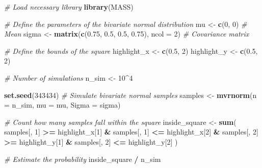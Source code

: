\documentclass[
]{book}
\newenvironment{Shaded}{\begin{snugshade}}{\end{snugshade}}
\newcommand{\AttributeTok}[1]{\textcolor[rgb]{0.13,0.29,0.53}{#1}}
\newcommand{\CommentTok}[1]{\textcolor[rgb]{0.56,0.35,0.01}{\textit{#1}}}
\newcommand{\DecValTok}[1]{\textcolor[rgb]{0.00,0.00,0.81}{#1}}
\newcommand{\FloatTok}[1]{\textcolor[rgb]{0.00,0.00,0.81}{#1}}
\newcommand{\FunctionTok}[1]{\textcolor[rgb]{0.13,0.29,0.53}{\textbf{#1}}}
\newcommand{\NormalTok}[1]{#1}
\newcommand{\OtherTok}[1]{\textcolor[rgb]{0.56,0.35,0.01}{#1}}
\newcommand{\SpecialCharTok}[1]{\textcolor[rgb]{0.81,0.36,0.00}{\textbf{#1}}}
\begin{document}
\begin{Shaded}
\begin{Highlighting}[]
\CommentTok{\# Load necessary library}
\FunctionTok{library}\NormalTok{(MASS)}

\CommentTok{\# Define the parameters of the bivariate normal distribution}
\NormalTok{mu }\OtherTok{\textless{}{-}} \FunctionTok{c}\NormalTok{(}\DecValTok{0}\NormalTok{, }\DecValTok{0}\NormalTok{)                       }\CommentTok{\# Mean}
\NormalTok{sigma }\OtherTok{\textless{}{-}} \FunctionTok{matrix}\NormalTok{(}\FunctionTok{c}\NormalTok{(}\FloatTok{0.75}\NormalTok{, }\FloatTok{0.5}\NormalTok{, }\FloatTok{0.5}\NormalTok{, }\FloatTok{0.75}\NormalTok{), }\AttributeTok{ncol =} \DecValTok{2}\NormalTok{) }\CommentTok{\# Covariance matrix}

\CommentTok{\# Define the bounds of the square}
\NormalTok{highlight\_x }\OtherTok{\textless{}{-}} \FunctionTok{c}\NormalTok{(}\FloatTok{0.5}\NormalTok{, }\DecValTok{2}\NormalTok{)}
\NormalTok{highlight\_y }\OtherTok{\textless{}{-}} \FunctionTok{c}\NormalTok{(}\FloatTok{0.5}\NormalTok{, }\DecValTok{2}\NormalTok{)}

\CommentTok{\# Number of simulations}
\NormalTok{n\_sim }\OtherTok{\textless{}{-}} \DecValTok{10}\SpecialCharTok{\^{}}\DecValTok{4}

\FunctionTok{set.seed}\NormalTok{(}\DecValTok{343434}\NormalTok{)}
\CommentTok{\# Simulate bivariate normal samples}
\NormalTok{samples }\OtherTok{\textless{}{-}} \FunctionTok{mvrnorm}\NormalTok{(}\AttributeTok{n =}\NormalTok{ n\_sim, }\AttributeTok{mu =}\NormalTok{ mu, }\AttributeTok{Sigma =}\NormalTok{ sigma)}

\CommentTok{\# Count how many samples fall within the square}
\NormalTok{inside\_square }\OtherTok{\textless{}{-}} \FunctionTok{sum}\NormalTok{(}
\NormalTok{  samples[, }\DecValTok{1}\NormalTok{] }\SpecialCharTok{\textgreater{}=}\NormalTok{ highlight\_x[}\DecValTok{1}\NormalTok{] }\SpecialCharTok{\&}\NormalTok{ samples[, }\DecValTok{1}\NormalTok{] }\SpecialCharTok{\textless{}=}\NormalTok{ highlight\_x[}\DecValTok{2}\NormalTok{] }\SpecialCharTok{\&}
\NormalTok{  samples[, }\DecValTok{2}\NormalTok{] }\SpecialCharTok{\textgreater{}=}\NormalTok{ highlight\_y[}\DecValTok{1}\NormalTok{] }\SpecialCharTok{\&}\NormalTok{ samples[, }\DecValTok{2}\NormalTok{] }\SpecialCharTok{\textless{}=}\NormalTok{ highlight\_y[}\DecValTok{2}\NormalTok{]}
\NormalTok{)}

\CommentTok{\# Estimate the probability}
\NormalTok{inside\_square }\SpecialCharTok{/}\NormalTok{ n\_sim}
\end{Highlighting}
\end{Shaded}
\end{document}
